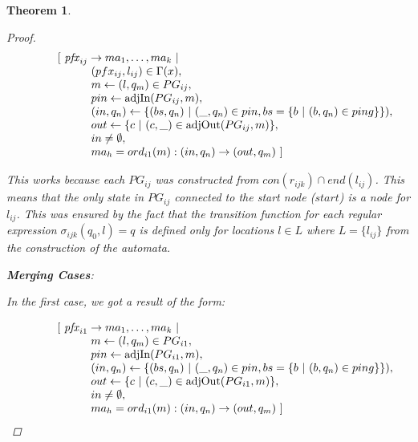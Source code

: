 \documentclass[twocolumn, openany]{sig-alternate-10pt}
\newtheorem{thm}{Theorem}
\begin{document}
\begin{thm}
\begin{proof}
 \[ \begin{array}{l}
     ~~~~~~~~~ [~ \mathit{pfx}_{ij} \rightarrow ma_1, \dots, ma_k ~\vert~ \\
     ~~~~~~~~~~~~~~~~~~ (pfx_{ij}, l_{ij}) \in \Gamma(x), \\
     ~~~~~~~~~~~~~~~~~~ m \leftarrow (l,q_m) \in PG_{ij}, \\
     ~~~~~~~~~~~~~~~~~~ pin \leftarrow \text{adjIn}(PG_{ij},m), \\
     ~~~~~~~~~~~~~~~~~~ (in,q_n) \leftarrow \{ (bs,q_n) ~\vert~ (\_,q_n) \in pin, bs=\{ b ~\vert~ (b,q_n) \in ping \} \}), \\
     ~~~~~~~~~~~~~~~~~~ out \leftarrow \{ c ~\vert~ (c,\_) \in \text{adjOut}(PG_{ij},m) \}, \\
     ~~~~~~~~~~~~~~~~~~ in \neq \emptyset, \\
     ~~~~~~~~~~~~~~~~~~ ma_h = ord_{i1}(m) : (in,q_n) \rightarrow (out,q_m) ~] \\
  \end{array} \]%

  This works because each $PG_{ij}$ was constructed from $con(r_{ijk}) \cap end(l_{ij})$. This means that the only state in $PG_{ij}$ connected to the start node ($\mathit{start}$) is a node for $l_{ij}$. This was ensured by the fact that the transition function for each regular expression $\sigma_{ijk}(q_0,l) = q$ is defined only for locations $l \in L$ where $L = \{ l_{ij} \}$ from the construction of the automata.

  \vspace{1em}
  \textbf{Merging Cases}:

  In the first case, we got a result of the form:

  \[ \begin{array}{l}
     ~~~~~~~~~ [~ \mathit{pfx}_{i1} \rightarrow ma_1, \dots, ma_k ~\vert~ \\
     ~~~~~~~~~~~~~~~~~~ m \leftarrow (l,q_m) \in PG_{i1}, \\
     ~~~~~~~~~~~~~~~~~~ pin \leftarrow \text{adjIn}(PG_{i1},m), \\
     ~~~~~~~~~~~~~~~~~~ (in,q_n) \leftarrow \{ (bs,q_n) ~\vert~ (\_,q_n) \in pin, bs=\{ b ~\vert~ (b,q_n) \in ping \} \}), \\
     ~~~~~~~~~~~~~~~~~~ out \leftarrow \{ c ~\vert~ (c,\_) \in \text{adjOut}(PG_{i1},m) \}, \\
     ~~~~~~~~~~~~~~~~~~ in \neq \emptyset, \\
     ~~~~~~~~~~~~~~~~~~ ma_h = ord_{i1}(m) : (in,q_n) \rightarrow (out,q_m) ~] \\
  \end{array} \]%


\end{proof}
\end{thm}
\end{document}
